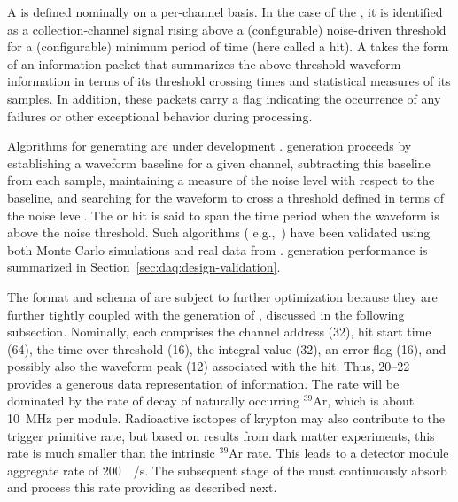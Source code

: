 A  is defined nominally on a per-channel basis. In the case of
the  , it is identified as a
collection-channel signal rising above a (configurable) noise-driven
threshold for a (configurable) minimum period of time (here called a
hit).
A  takes the form of an information packet that 
summarizes the above-threshold waveform information in terms of its
threshold crossing times and statistical measures of its  samples. 
In addition, these packets carry a flag indicating the occurrence of any
failures or other exceptional behavior during  processing.


Algorithms for generating  are under development
\cite{bib:docdb11275}.   generation proceeds
by establishing a waveform baseline
for a given channel, subtracting this baseline from each sample, maintaining
a measure of the noise level with respect to the baseline, and searching for the waveform to cross a
threshold defined in terms of the noise level.
The   or hit is said to span the time period when the waveform is above the noise threshold.
Such algorithms ( e.g.,~\cite{bib:docdb11236}) have been validated
using both Monte Carlo simulations and 
real data from . 
 generation performance is summarized in
Section~\ref{sec:daq:design-validation}.

The format and schema of  are subject to further
optimization because they are further tightly coupled with the generation of
, discussed in the following subsection. Nominally,
each  comprises the channel address (\SI{32}{\bit}), hit
start time (\SI{64}{\bit}), the time over
threshold (\SI{16}{\bit}), the integral  value (\SI{32}{\bit}),
an error flag (\SI{16}{\bit}), and possibly also
the waveform peak (\SI{12}{\bit}) associated with the hit. 
Thus, \SIrange{20}{22}{\byte} provides a generous data
representation of  information. 
The  rate will be dominated by the rate of decay of naturally occurring
$^{39}$Ar, which is about \SI{10}{\mega\hertz} per module. Radioactive
isotopes of krypton may also contribute to the trigger primitive rate,
but based on results from dark matter experiments, this rate is much
smaller than the intrinsic $^{39}$Ar rate. 
This leads to a detector module  aggregate rate of
\SI{200}{\mega\byte/\second}.
The subsequent stage of the  must continuously absorb and process this
rate providing  as described next.

